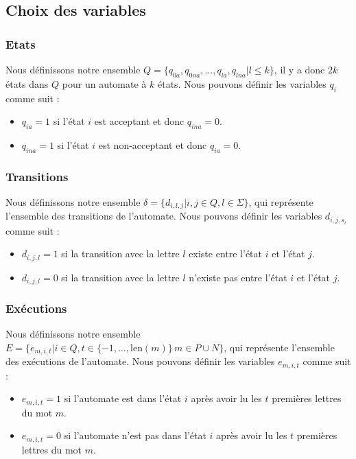 \documentclass[a4paper, 12pt]{extarticle}
\begin{document}
\subsection{Choix des variables} %
\label{sub:choix_des_variables}

\subsubsection{Etats} %
\label{sec:etats}

Nous définissons notre ensemble $Q = \{q_{0a}, q_{0na}, \dots, q_{la}, q_{lna} | l \le k\}$, il y a
donc $2k$ états dans $Q$ pour un automate à $k$ états. Nous pouvons définir les variables $q_i$ comme suit : 
\begin{itemize}[label=$\bullet$]
    \item $q_{ia} = 1$ si l'état $i$ est acceptant et donc $q_{ina} = 0$.
    \item $q_{ina} = 1$ si l'état $i$ est non-acceptant et donc $q_{ia} = 0$.
\end{itemize}

\subsubsection{Transitions} %
\label{sec:transitions} 

Nous définissons notre ensemble $\delta = \{d_{i, l, j} | i, j \in Q, l \in \Sigma\}$, qui 
représente l'ensemble des transitions de l'automate. 
Nous pouvons définir les variables $d_{i, j, s_i}$ comme suit : 
\begin{itemize}[label=$\bullet$]
    \item $d_{i, j, l} = 1$ si la transition avec la lettre $l$ existe entre l'état $i$ et l'état $j$.
    \item $d_{i, j, l} = 0$ si la transition avec la lettre $l$ n'existe pas entre l'état $i$ et l'état $j$.
\end{itemize} 


\subsubsection{Exécutions}
\label{sec:executions}

Nous définissons notre ensemble $E = \{e_{m, i, t} | i \in Q, t \in \{-1,\dots,\text{len}(m)\}\, m \in P \cup N\}$,
qui représente l'ensemble des exécutions de l'automate. Nous pouvons définir les variables $e_{m, i, t}$ comme suit :
\begin{itemize}[label=$\bullet$]
    \item $e_{m, i, t} = 1$ si l'automate est dans l'état $i$ après avoir lu les $t$ premières lettres du mot $m$.
    \item $e_{m, i, t} = 0$ si l'automate n'est pas dans l'état $i$ après avoir lu les $t$ premières lettres du mot $m$.
\end{itemize}
\end{document}
